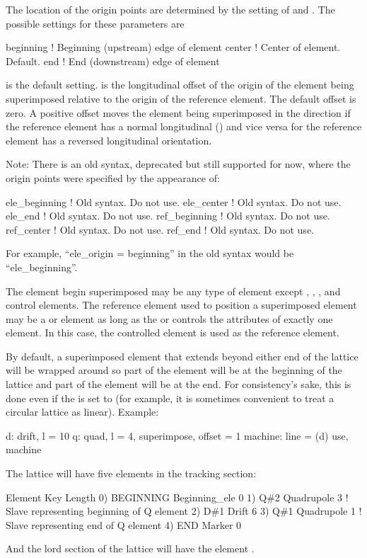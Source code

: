 The location of the origin points are determined by the setting of  and
.  The possible settings for these parameters are
\begin{example}
  beginning       ! Beginning (upstream) edge of element
  center          ! Center of element. Default.
  end             ! End (downstream) edge of element
\end{example}
 is the default setting.  is the longitudinal offset of the origin 
of the element being superimposed relative
to the origin of the reference element. The default offset is zero.  
A positive offset moves the element being superimposed in the  direction if
the reference element has a normal longitudinal  () and
vice versa for the reference element has a reversed longitudinal orientation.

Note: There is an old syntax, deprecated but still supported for now, where the origin points were
specified by the appearance of:
\begin{example}
  ele_beginning         ! Old syntax. Do not use.
  ele_center            ! Old syntax. Do not use.
  ele_end               ! Old syntax. Do not use.
  ref_beginning         ! Old syntax. Do not use.
  ref_center            ! Old syntax. Do not use.
  ref_end               ! Old syntax. Do not use.
\end{example}
For example, ``ele_origin = beginning'' in the old syntax would be ``ele_beginning''.

The element begin superimposed may be any type of element except , ,
, and  control elements. The reference element used to position a
superimposed element may be a  or  element as long as the  or
 controls the attributes of exactly one element. In this case, the controlled element is
used as the reference element.

By default, a superimposed element that extends beyond either end of the lattice will be wrapped
around so part of the element will be at the beginning of the lattice and part of the element will
be at the end. For consistency's sake, this is done even if the  is set to 
(for example, it is sometimes convenient to treat a circular lattice as linear). Example:
\begin{example}
  d: drift, l = 10
  q: quad, l = 4, superimpose, offset = 1
  machine: line = (d)
  use, machine
\end{example}
The lattice will have five elements in the tracking section:
\begin{example}
        Element    Key             Length
  0)    BEGINNING  Beginning_ele   0
  1)    Q{\#}2        Quadrupole      3   ! Slave representing beginning of Q element
  2)    D{\#}1        Drift           6
  3)    Q{\#}1        Quadrupole      1   ! Slave representing end of Q element
  4)    END        Marker          0
\end{example}
And the lord section of the lattice will have the element . 

